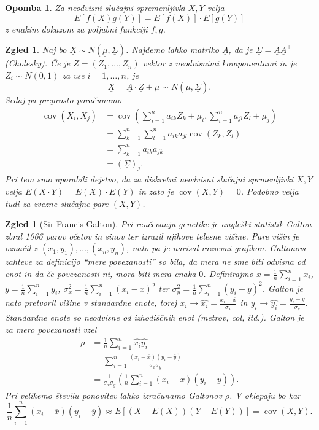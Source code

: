 \documentclass[10pt, a4paper]{article}
\newtheorem*{opomba}{Opomba}
\newtheorem{zgled}[izr]{Zgled}
\DeclareMathOperator{\cov}{cov}
\begin{document}
\begin{opomba}
  Za neodvisni slučajni spremenljivki $X, Y$ velja 
  $$E[f(X) g(Y)] = E[f(X)] \cdot E[g(Y)]$$
  z enakim dokazom za poljubni funkciji $f, g$.
\end{opomba}

\begin{zgled}
  Naj bo $\underline{X} \sim N(\underline{\mu}, \underline{\Sigma})$.
  Najdemo lahko matriko $\underline{A}$, da je $\underline{\Sigma} = \underline{A} \underline{A}^\top$ (Cholesky).
  Če je $\underline{Z} = (Z_1, \dots, Z_n)$ vektor z neodvisnimi komponentami in je 
  $Z_i \sim N(0, 1)$ za vse $i = 1, \dots, n$, je 
  $$\underline{X} = \underline{A} \cdot \underline{Z} + \underline{\mu} \sim N(\underline{\mu}, \underline{\Sigma}).$$
  Sedaj pa preprosto poračunamo 
  \begin{align*}
    \cov(X_i, X_j) &= \cov \left(\sum_{i = 1} ^n a_{ik} Z_k + \mu_i, \sum_{i = 1} ^n a_{jl} Z_l + \mu_j\right)\\
    &= \sum_{k = 1} ^n \sum_{l = 1} ^n a_{ik} a_{jl} \cov(Z_k, Z_l)\\
    &= \sum_{k = 1} ^n a_{ik} a_{jk}\\
    &= (\underline{\Sigma})_j.
  \end{align*}
  Pri tem smo uporabili dejstvo, da za diskretni neodvisni slučajni sprmenljivki $X, Y$
  velja $E(X \cdot Y) = E(X) \cdot E(Y)$ in zato je $\cov (X, Y) = 0$.
  Podobno velja tudi za zvezne slučajne pare $(X, Y)$.
\end{zgled}

\begin{zgled}[Sir Francis Galton]
  Pri reučevanju genetike je angleški statistik Galton zbral 1066 parov očetov in sinov ter 
  izrazil njihove telesne višine. Pare višin je označil z 
  $(x_1, y_1), \dots, (x_n, y_n)$, nato pa je narisal razsevni grafikon.
  Galtonove zahteve za definicijo "`mere povezanosti"' so bila, 
  da mera ne sme biti odvisna od enot in da če povezanosti ni, mora biti mera enaka $0$.
  Definirajmo $\overline{x} = \frac{1}{n} \sum_{i = 1} ^n x_i$, $\overline{y} = \frac{1}{n} \sum_{i = 1} ^n y_i$,
  $\sigma_x ^2 = \frac{1}{n} \sum_{i = 1} ^n (x_i - \overline{x})^2$ ter $\sigma_y ^2 = \frac{1}{n} \sum_{i = 1} ^n (y_i - \overline{y})^2$.
  Galton je nato pretvoril višine v standardne enote, torej 
  $x_i \to \hat{x_i} = \frac{x_i - \overline{x}}{\sigma_x}$ in $y_i \to \hat{y_i} = \frac{y_i - \overline{y}}{\sigma_y}$.
  Standardne enote so neodvisne od izhodiščnih enot (metrov, col, itd.).
  Galton je za mero povezanosti vzel 
  \begin{align*}
    \rho &= \frac{1}{n} \sum_{i = 1} ^n \hat{x_i} \hat{y_i}\\
    &= \sum_{i = 1} ^n \frac{(x_i - \overline{x}) (y_i - \overline{y})}{\sigma_x \sigma_y}\\
    &= \frac{1}{\sigma_x \sigma_y} \left(\frac{1}{n}\sum_{i = 1} ^n (x_i - \overline{x}) (y_i - \overline{y}) \right).
  \end{align*}
  Pri velikemo številu ponovitev lahko izračunamo Galtonov $\rho$. V oklepaju bo kar
  $$\frac{1}{n} \sum_{i = 1} ^n(x_i - \overline{x}) (y_i - \overline{y}) \approx E[(X - E(X)) (Y - E(Y))] = \cov(X, Y).$$
\end{zgled}
\end{document}
